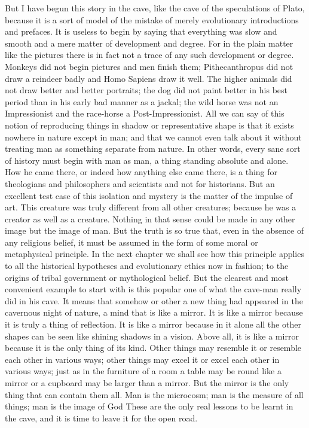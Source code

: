 But I have begun this story in the cave, like the cave of the speculations of Plato, because it is a sort of model of the mistake of merely evolutionary introductions and prefaces. It is useless to begin by saying that everything was slow and smooth and a mere matter of development and degree. For in the plain matter like the pictures there is in fact not a trace of any such development or degree. Monkeys did not begin pictures and men finish them; Pithecanthropus did not draw a reindeer badly and Homo Sapiens draw it well. The higher animals did not draw better and better portraits; the dog did not paint better in his best period than in his early bad manner as a jackal; the wild horse was not an Impressionist and the race-horse a Post-Impressionist. All we can say of this notion of reproducing things in shadow or representative shape is that it exists nowhere in nature except in man; and that we cannot even talk about it without treating man as something separate from nature. In other words, every sane sort of history must begin with man as man, a thing standing absolute and alone. How he came there, or indeed how anything else came there, is a thing for theologians and philosophers and scientists and not for historians. But an excellent test case of this isolation and mystery is the matter of the impulse of art. This creature was truly different from all other creatures; because he was a creator as well as a creature. Nothing in that sense could be made in any other image but the image of man. But the truth is so true that, even in the absence of any religious belief, it must be assumed in the form of some moral or metaphysical principle. In the next chapter we shall see how this principle applies to all the historical hypotheses and evolutionary ethics now in fashion; to the origins of tribal government or mythological belief. But the clearest and most convenient example to start with is this popular one of what the cave-man really did in his cave. It means that somehow or other a new thing had appeared in the cavernous night of nature, a mind that is like a mirror. It is like a mirror because it is truly a thing of reflection. It is like a mirror because in it alone all the other shapes can be seen like shining shadows in a vision. Above all, it is like a mirror because it is the only thing of its kind. Other things may resemble it or resemble each other in various ways; other things may excel it or excel each other in various ways; just as in the furniture of a room a table may be round like a mirror or a cupboard may be larger than a mirror. But the mirror is the only thing that can contain them all. Man is the microcosm; man is the measure of all things; man is the image of God These are the only real lessons to be learnt in the cave, and it is time to leave it for the open road.

